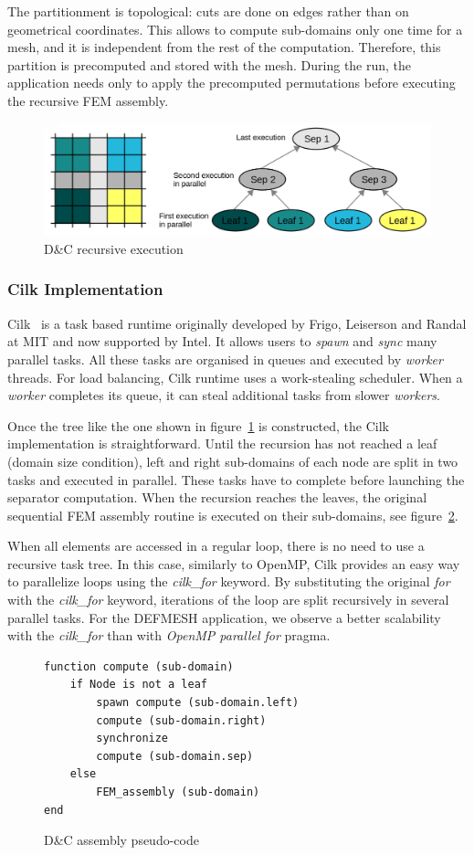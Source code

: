 \documentclass{IOS-Book-Article}
\begin{document}
The partitionment is topological: cuts are done on edges rather than on geometrical coordinates.
This allows to compute sub-domains only one time for a mesh, and it is independent from the rest of the computation. Therefore, this partition is precomputed and stored with the mesh.
During the run, the application needs only to apply the precomputed permutations before executing the recursive FEM assembly.
\begin{figure}[htp]
 \centering
 \includegraphics[scale=0.25]{DC_recursion.png}
 \caption{D\&C recursive execution}
 \label{fig:DCrec}
\end{figure}

\subsubsection{Cilk Implementation}
Cilk~\cite{cilk5} is a task based runtime originally developed by Frigo, Leiserson and Randal at MIT and now supported by Intel.
It allows users to \emph{spawn} and \emph{sync} many parallel tasks.
All these tasks are organised in queues and executed by \emph{worker} threads.
For load balancing, Cilk runtime uses a work-stealing scheduler. When a \emph{worker} completes its queue, it can steal additional tasks from slower \emph{workers}.

Once the tree like the one shown in figure~\ref{fig:DCrec} is constructed, the Cilk implementation is straightforward.
Until the recursion has not reached a leaf (domain size condition), left and right sub-domains of each node are split in two tasks and executed in parallel.
These tasks have to complete before launching the separator computation. 
When the recursion reaches the leaves, the original sequential FEM assembly routine is executed on their sub-domains, see figure~\ref{fig:DCcode}.

When all elements are accessed in a regular loop, there is no need to use a recursive task tree.
In this case, similarly to OpenMP, Cilk provides an easy way to parallelize loops using the \emph{cilk\_for} keyword.
By substituting the original \emph{for} with the \emph{cilk\_for} keyword, iterations of the loop are split recursively in several parallel tasks.
For the DEFMESH application, we observe a better scalability with the \emph{cilk\_for} than with \emph{OpenMP parallel for} pragma.
\begin{figure}[htp]
\small
 \begin{verbatim}
function compute (sub-domain) 
    if Node is not a leaf
        spawn compute (sub-domain.left)
        compute (sub-domain.right)
        synchronize
        compute (sub-domain.sep)
    else
        FEM_assembly (sub-domain)
end        
 \end{verbatim}
 \caption{D\&C assembly pseudo-code}
 \label{fig:DCcode}
\end{figure}
\end{document}
